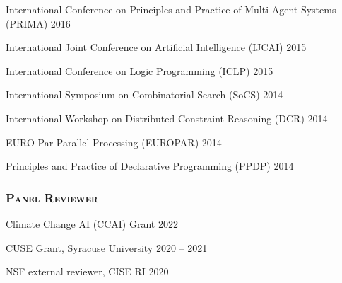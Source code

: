   \item International Conference on Principles and Practice of Multi-Agent Systems (PRIMA) \hfill{2016}
  
  \item International Joint Conference on Artificial Intelligence (IJCAI) \hfill {2015}
  
  \item International Conference on Logic Programming (ICLP) \hfill {2015}
  
  \item International Symposium on Combinatorial Search (SoCS) \hfill {2014}
  
  \item International Workshop on Distributed Constraint Reasoning (DCR) \hfill 2014
  
  \item EURO-Par Parallel Processing (EUROPAR) \hfill {2014}
  
  \item Principles and Practice of Declarative Programming (PPDP) \hfill {2014}
\endList

\subsubsection*{\scshape Panel Reviewer}{}{}{}
\beginList
  \item 
  Climate Change AI (CCAI) Grant \hfill {2022}
  \item 
  CUSE Grant, Syracuse University \hfill {2020 -- 2021}
  \item 
  NSF external reviewer, CISE RI \hfill {2020}
\endList
